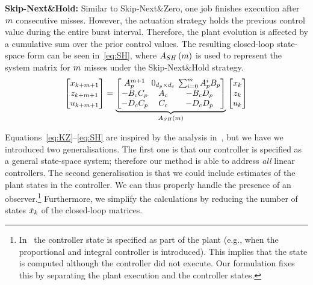 \textbf{Skip-Next\&Hold: }%
%
Similar to Skip-Next\&Zero, one job finishes execution after
$m$ consecutive misses. However, the actuation strategy
holds the previous control value during the entire burst
interval. Therefore, the plant evolution is affected by a
cumulative sum over the prior control values. The resulting
closed-loop state-space form can be seen in~\eqref{eq:SH}, where
$A_{SH}\left(m\right)$ is used to represent the system matrix
for $m$ misses under the Skip-Next\&Hold strategy.
%
\begin{equation}
\setlength\arraycolsep{2pt}
\label{eq:SH}
    \begin{bmatrix}
        x_{k+\nummisses+1} \\
        z_{k+\nummisses+1} \\
        u_{k+\nummisses+1}
    \end{bmatrix} = 
    \underbrace{\begin{bmatrix}
        A_p^{\nummisses+1}  & 0_{\numstatesplant \times \numstatesctl}  & \sum_{i=0}^\nummisses A_p^iB_p \\
        -B_cC_p             & A_c                                       & -B_cD_p \\
        -D_cC_p             & C_c                                       & -D_cD_p
    \end{bmatrix}}_{A_{SH}\funof{\nummisses}}
    \begin{bmatrix}
        x_{k} \\
        z_{k} \\
        u_{k}
    \end{bmatrix}
\end{equation}

Equations~\eqref{eq:KZ}--\eqref{eq:SH} are inspired by the analysis 
in~\cite{Maggio:2020}, but we have we introduced two generalisations. The
first one is that our controller is specified as a general
state-space system; therefore our method is able to address
\emph{all} linear controllers. The second generalisation is that
we could include estimates of the plant states in the controller.
We can thus properly handle the presence 
of an observer.\footnote{In~\cite{Maggio:2020} the
controller state is specified as part of the plant (e.g., when the proportional and integral
controller is introduced). This implies that the state is computed
although the controller did not execute. Our formulation fixes
this by separating the plant execution and the controller
states.} Furthermore, we simplify the calculations by reducing
the number of states $\Tilde{x}_k$ of the closed-loop matrices.

